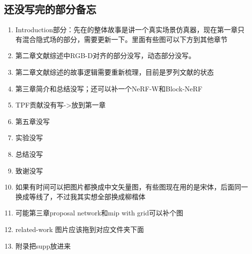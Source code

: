 %
%
%
%
%
%

\begin{appendices}
  \section{还没写完的部分备忘}
  \begin{enumerate}
      \item Introduction部分：先在的整体故事是讲一个真实场景仿真器，现在第一章只有混合隐式场的部分，需要更新一下。里面有些图可以下方到其他章节
      \item 第二章文献综述中RGB-D对齐的部分没写，动态部分没写。
      \item 第二章文献综述的故事逻辑需要重新梳理，目前是罗列文献的状态
      \item 第三章简介和总结没写；还可以补一个NeRF-W和Block-NeRF
      \item TPF贡献没有写->放到第一章
      \item 第五章没写
      \item 实验没写
      \item 总结没写
      \item 致谢没写
      \item 如果有时间可以把图片都换成中文矢量图，有些图现在用的是宋体，后面同一换成等线了，不过我其实想全部换成柳楷体
      \item 可能第三章proposal network和mip with grid可以补个图
      \item related-work 图片应该拖到对应文件夹下面
      \item 附录把supp放进来
  \end{enumerate}

\end{appendices}

